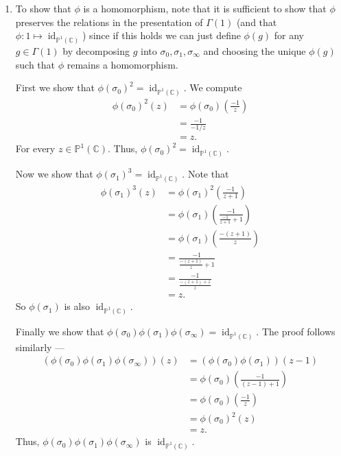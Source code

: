 \documentclass[12 pt, letterpaper]{hmcpset}
\begin{document}
\begin{solution}
	\begin{enumerate}
		\item To show that $\phi$ is a homomorphism, note that it is sufficient to show that $\phi$ preserves the relations in the presentation of $\Gamma(1)$ (and that $\phi : 1 \mapsto \operatorname{id}_{\mathbb{P}^{1}(\mathbb{C})}$) since if this holds we can just define $\phi(g)$ for any $g \in \Gamma(1)$ by decomposing $g$ into $\sigma_{0}, \sigma_{1}, \sigma_{\infty}$ and choosing the unique $\phi(g)$ such that $\phi$ remains a homomorphism.

			First we show that $\phi(\sigma_{0})^{2} = \operatorname{id}_{\mathbb{P}^{1}(\mathbb{C})}$. We compute
			\[
				\begin{split}
					\phi(\sigma_{0})^{2}(z) & = \phi(\sigma_{0}) \left ( \frac{-1}{z} \right ) \\
								& = \frac{-1}{-1 / z} \\
								& = z.
				\end{split}
			\]
			For every $z \in \mathbb{P}^{1}(\mathbb{C})$. Thus, $\phi(\sigma_{0})^{2} = \operatorname{id}_{\mathbb{P}^{1}(\mathbb{C})}$.

			Now we show that $\phi(\sigma_{1})^{3} = \operatorname{id}_{\mathbb{P}^{1}(\mathbb{C})}$. Note that
			\[
				\begin{split}
					\phi(\sigma_{1})^{3}(z) & = \phi(\sigma_{1})^{2} \left ( \frac{-1}{z + 1} \right ) \\
								& = \phi(\sigma_{1}) \left ( \frac{-1}{\frac{-1}{z + 1} + 1} \right ) \\
								& = \phi(\sigma_{1}) \left ( \frac{-(z + 1)}{z} \right ) \\
								& = \frac{-1}{\frac{-(z + 1)}{z} + 1} \\
								& = \frac{-1}{\frac{-(z + 1) + z}{z}} \\
								& = z.
				\end{split}
			\]
			So $\phi(\sigma_{1})$ is also $\operatorname{id}_{\mathbb{P}^{1}(\mathbb{C})}$.

			Finally we show that $\phi(\sigma_{0}) \phi(\sigma_{1}) \phi(\sigma_{\infty}) = \operatorname{id}_{\mathbb{P}^{1}(\mathbb{C})}$. The proof follows similarly ---
			\[
				\begin{split}
					(\phi(\sigma_{0}) \phi(\sigma_{1}) \phi(\sigma_{\infty}))(z) & = (\phi(\sigma_{0}) \phi(\sigma_{1})) \left ( z - 1 \right ) \\
												     & = \phi(\sigma_{0}) \left ( \frac{-1}{(z - 1) + 1} \right ) \\
												     & = \phi(\sigma_{0}) \left ( \frac{-1}{z} \right ) \\
												     & =
\phi(\sigma_{0})^{2} (z) \\
												     & = z.
				\end{split}
			\]
			Thus, $\phi(\sigma_{0}) \phi(\sigma_{1}) \phi(\sigma_{\infty})$ is $\operatorname{id}_{\mathbb{P}^{1}(\mathbb{C})}$.


\end{enumerate}
\end{solution}
\end{document}
